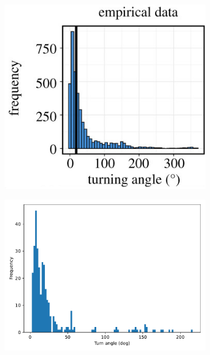 \documentclass[9pt]{pnas-new}
\begin{document}
\begin{figure}[h]
    \centering
    \begin{subfigure}[t]{.45\textwidth}
        \centering
        \includegraphics[width=0.8\linewidth]{empirical_turn_angle.png}
    \end{subfigure}%
    \hspace{.5cm} %
    \begin{subfigure}[t]{.45\textwidth}
        \centering
        \includegraphics[width=1.02\linewidth]{avoid_direction_attack_peripheral/turn_angle_freq_2008.pdf}
    \end{subfigure}
    \hspace{.5cm} %

\end{figure}
\end{document}
